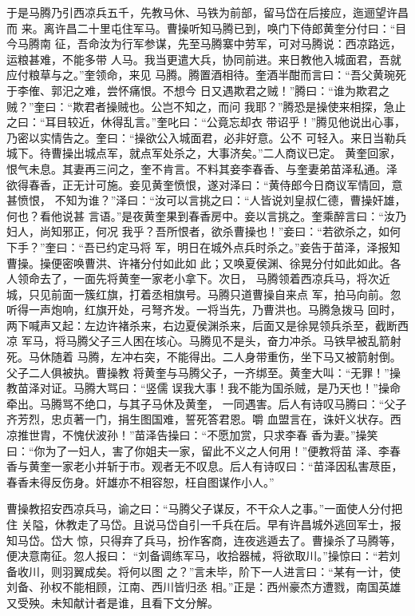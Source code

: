 于是马腾乃引西凉兵五千，先教马休、马铁为前部，留马岱在后接应，迤逦望许昌而
来。离许昌二十里屯住军马。曹操听知马腾已到，唤门下侍郎黄奎分付曰：“目今马腾南
征，吾命汝为行军参谋，先至马腾寨中劳军，可对马腾说：西凉路远，运粮甚难，不能多带
人马。我当更遣大兵，协同前进。来日教他入城面君，吾就应付粮草与之。”奎领命，来见
马腾。腾置酒相待。奎酒半酣而言曰：“吾父黄琬死于李傕、郭汜之难，尝怀痛恨。不想今
日又遇欺君之贼！”腾曰：“谁为欺君之贼？”奎曰：“欺君者操贼也。公岂不知之，而问
我耶？”腾恐是操使来相探，急止之曰：“耳目较近，休得乱言。”奎叱曰：“公竟忘却衣
带诏乎！”腾见他说出心事，乃密以实情告之。奎曰：“操欲公入城面君，必非好意。公不
可轻入。来日当勒兵城下。待曹操出城点军，就点军处杀之，大事济矣。”二人商议已定。
黄奎回家，恨气未息。其妻再三问之，奎不肯言。不料其妾李春香、与奎妻弟苗泽私通。泽
欲得春香，正无计可施。妾见黄奎愤恨，遂对泽曰：“黄侍郎今日商议军情回，意甚愤恨，
不知为谁？”泽曰：“汝可以言挑之曰：“人皆说刘皇叔仁德，曹操奸雄，何也？看他说甚
言语。”是夜黄奎果到春香房中。妾以言挑之。奎乘醉言曰：“汝乃妇人，尚知邪正，何况
我乎？吾所恨者，欲杀曹操也！”妾曰：“若欲杀之，如何下手？”奎曰：“吾已约定马将
军，明日在城外点兵时杀之。”妾告于苗泽，泽报知曹操。操便密唤曹洪、许褚分付如此如
此；又唤夏侯渊、徐晃分付如此如此。各人领命去了，一面先将黄奎一家老小拿下。次日，
马腾领着西凉兵马，将次近城，只见前面一簇红旗，打着丞相旗号。马腾只道曹操自来点
军，拍马向前。忽听得一声炮响，红旗开处，弓弩齐发。一将当先，乃曹洪也。马腾急拨马
回时，两下喊声又起：左边许褚杀来，右边夏侯渊杀来，后面又是徐晃领兵杀至，截断西凉
军马，将马腾父子三人困在垓心。马腾见不是头，奋力冲杀。马铁早被乱箭射死。马休随着
马腾，左冲右突，不能得出。二人身带重伤，坐下马又被箭射倒。父子二人俱被执。曹操教
将黄奎与马腾父子，一齐绑至。黄奎大叫：“无罪！”操教苗泽对证。马腾大骂曰：“竖儒
误我大事！我不能为国杀贼，是乃天也！”操命牵出。马腾骂不绝口，与其子马休及黄奎，
一同遇害。后人有诗叹马腾曰：“父子齐芳烈，忠贞著一门，捐生图国难，誓死答君恩。嚼
血盟言在，诛奸义状存。西凉推世胄，不愧伏波孙！”苗泽告操曰：“不愿加赏，只求李春
香为妻。”操笑曰：“你为了一妇人，害了你姐夫一家，留此不义之人何用！”便教将苗
泽、李春香与黄奎一家老小并斩于市。观者无不叹息。后人有诗叹曰：“苗泽因私害荩臣，
春香未得反伤身。奸雄亦不相容恕，枉自图谋作小人。”

曹操教招安西凉兵马，谕之曰：“马腾父子谋反，不干众人之事。”一面使人分付把住
关隘，休教走了马岱。且说马岱自引一千兵在后。早有许昌城外逃回军士，报知马岱。岱大
惊，只得弃了兵马，扮作客商，连夜逃遁去了。曹操杀了马腾等，便决意南征。忽人报曰：
“刘备调练军马，收拾器械，将欲取川。”操惊曰：“若刘备收川，则羽翼成矣。将何以图
之？”言未毕，阶下一人进言曰：“某有一计，使刘备、孙权不能相顾，江南、西川皆归丞
相。”正是：西州豪杰方遭戮，南国英雄又受殃。未知献计者是谁，且看下文分解。